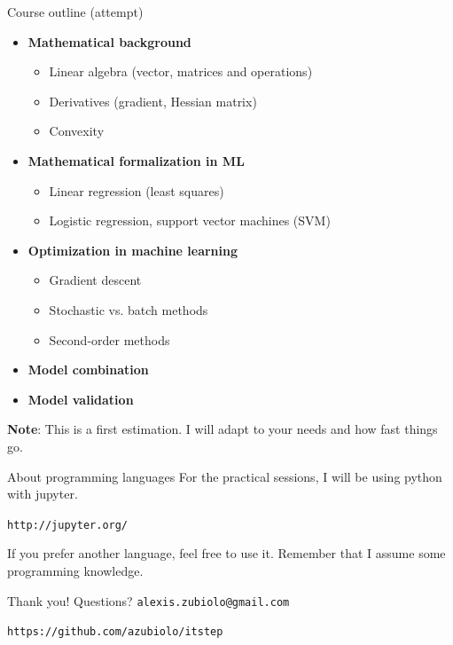 \documentclass{beamer}
\begin{document}
\begin{frame}{Course outline (attempt)}
\vfill
\begin{itemize}
  \item \textbf{Mathematical background}
  \begin{itemize}
  	\item Linear algebra (vector, matrices and operations)
  	\item Derivatives (gradient, Hessian matrix)
  	\item Convexity
  \end{itemize}
  \item \textbf{Mathematical formalization in ML}
  \begin{itemize}
  	\item Linear regression (least squares)
  	\item Logistic regression, support vector machines (SVM)
  \end{itemize}
  \item \textbf{Optimization in machine learning}
  \begin{itemize}
  	\item Gradient descent
  	\item Stochastic vs. batch methods
  	\item Second-order methods
  \end{itemize}
  \item \textbf{Model combination}
  \item \textbf{Model validation}
\end{itemize}
\vfill
\textbf{Note}: This is a first estimation. I will adapt to your needs and how fast things go.
\end{frame}

\begin{frame}{About programming languages}
For the practical sessions, I will be using python with jupyter.
\begin{center}
\texttt{http://jupyter.org/}
\end{center}
\vfill
If you prefer another language, feel free to use it. Remember that I assume some programming knowledge.
\end{frame}

\begin{frame}
\vfill
\centering
\begin{huge}
\huge{Thank you! Questions?}
\vfill
\texttt{alexis.zubiolo@gmail.com}
\end{huge}
\vfill
\begin{Large}
\texttt{https://github.com/azubiolo/itstep}
\end{Large}
\vfill
\end{frame}
\end{document}
